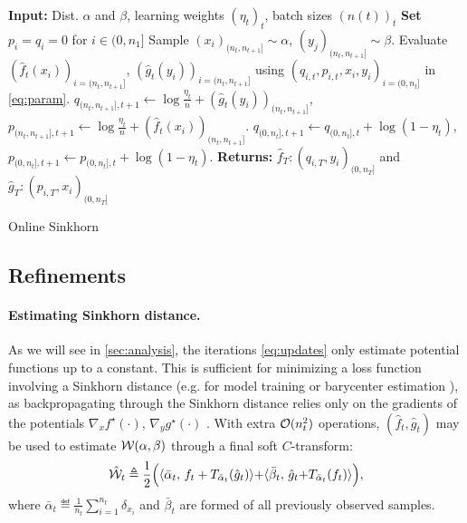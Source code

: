 \begin{algorithm}[t]
    \begin{algorithmic}
    \State \textbf{Input:} Dist. $\alpha$ and $\beta$, learning weights ${(\eta_t)}_t$, batch sizes ${(n(t))}_t$
    \textbf{Set} $p_i = q_i = 0$ for $i \in (0, n_1]$
        \State Sample $(x_i)_{(n_t, n_{t+1}]} \sim \alpha$, $(y_j)_{(n_t, n_{t+1}]} \sim \beta$.
            \State Evaluate $(\hat f_t(x_i))_{i=(n_t, n_{t+1}]}$,
             $(\hat g_t(y_i))_{i=(n_t, n_{t+1}]}$ using $(q_{i,t}, p_{i,t}, x_i, y_i)_{i=(0,n_{t}]}$ in \eqref{eq:param}.
             \State $q_{(n_t, n_{t+1}],t+1} {\gets} \log \frac{\eta_t}{n}
             + (\hat g_t(y_i))_{(n_t, n_{t+1}]}$,
             \qquad $p_{(n_t, n_{t+1}],t+1} {\gets} \log \frac{\eta_t}{n} 
             + (\hat f_t(x_i))_{(n_t, n_{t+1}]}$.
            \State $q_{(0, n_t],t+1} \gets q_{(0, n_t],t} + \log(1 - \eta_t)$, \qquad
            $p_{(0, n_t],t+1} \gets p_{(0, n_t],t} + \log(1 - \eta_t)$.
    \EndFor
    \State \textbf{Returns:} $\hat f_T : (q_{i,T}, y_i)_{(0, n_T]}$ and
    $\hat g_T : (p_{i,T}, x_i)_{(0, n_T]}$
    \end{algorithmic}
    \vspace{-.4em}
    \caption{Online Sinkhorn}\label{alg:online_sinkhorn}
\end{algorithm}


\subsection{Refinements}

\paragraph{Estimating Sinkhorn distance.} 

As we will see in \autoref{sec:analysis}, the iterations \eqref{eq:updates} only estimate potential functions up to a
constant. This is sufficient for minimizing a loss function involving a Sinkhorn
distance (e.g. for model training or barycenter estimation \citep{staib2017parallel}), as backpropagating through the Sinkhorn distance
relies only on the gradients of the potentials $\nabla_x f^\star(\cdot)$,
$\nabla_y g^\star(\cdot)$ \citep[e.g.][]{cuturi2018semidual}. With extra
$\Oo(n_t^2)$ operations, $(\hat f_t, \hat g_t)$ may be used to
estimate $\Ww(\alpha,\beta)$ through a final soft $C$-transform:
\begin{equation}\label{eq-dist-est}
    \hat \Ww_t \triangleq \frac{1}{2}\Big(\dotp{\bar \alpha_t}{f_t + 
    \Ctrans{\hat g_t}{\bar \alpha_t}}
     {+} \dotp{\bar \beta_t}{\hat g_t {+} \Ctrans{f_t}{\bar \alpha_t}}\Big),
\end{equation}
where $\bar \alpha_t \eqdef \frac{1}{n_{t}}\sum_{i=1}^{n_{t}} \delta_{x_i}$
and $\bar \beta_t$ are formed of all previously observed samples.


